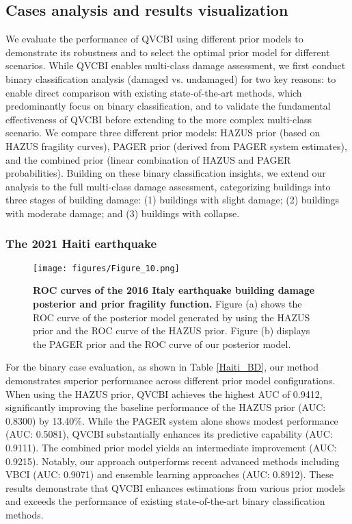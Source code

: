 \documentclass[review]{elsarticle}
\begin{document}
\subsection{Cases analysis and results visualization}
We evaluate the performance of QVCBI using different prior models to demonstrate its robustness and to select the optimal prior model for different scenarios. While QVCBI enables multi-class damage assessment, we first conduct binary classification analysis (damaged vs. undamaged) for two key reasons: to enable direct comparison with existing state-of-the-art methods, which predominantly focus on binary classification, and to validate the fundamental effectiveness of QVCBI before extending to the more complex multi-class scenario. We compare three different prior models: HAZUS prior (based on HAZUS fragility curves), PAGER prior (derived from PAGER system estimates), and the combined prior (linear combination of HAZUS and PAGER probabilities). Building on these binary classification insights, we extend our analysis to the full multi-class damage assessment, categorizing buildings into three stages of building damage: (1) buildings with slight damage; (2) buildings with moderate damage; and (3) buildings with collapse.



\subsubsection{The 2021 Haiti earthquake}

   \begin{figure*}[t]
    \centering
\texttt{[image: figures/Figure\_10.png]}
    \caption{\textbf{ROC curves of the 2016 Italy earthquake building damage posterior and prior fragility function.} Figure (a) shows the ROC curve of the posterior model generated by using the HAZUS prior and the ROC curve of the HAZUS prior. Figure (b) displays the PAGER prior and the ROC curve of our posterior model.}
    \label{Italy_ROC}
\end{figure*}


For the binary case evaluation, as shown in Table \ref{Haiti_BD}, our method demonstrates superior performance across different prior model configurations. When using the HAZUS prior, QVCBI achieves the highest AUC of 0.9412, significantly improving the baseline performance of the HAZUS prior (AUC: 0.8300) by 13.40\%. While the PAGER system alone shows modest performance (AUC: 0.5081), QVCBI substantially enhances its predictive capability (AUC: 0.9111). The combined prior model yields an intermediate improvement (AUC: 0.9215). Notably, our approach outperforms recent advanced methods including VBCI \cite{xu2022seismic} (AUC: 0.9071) and ensemble learning approaches \cite{rao2023earthquake} (AUC: 0.8912). These results demonstrate that QVCBI enhances estimations from various prior models and exceeds the performance of existing state-of-the-art binary classification methods.
\end{document}
